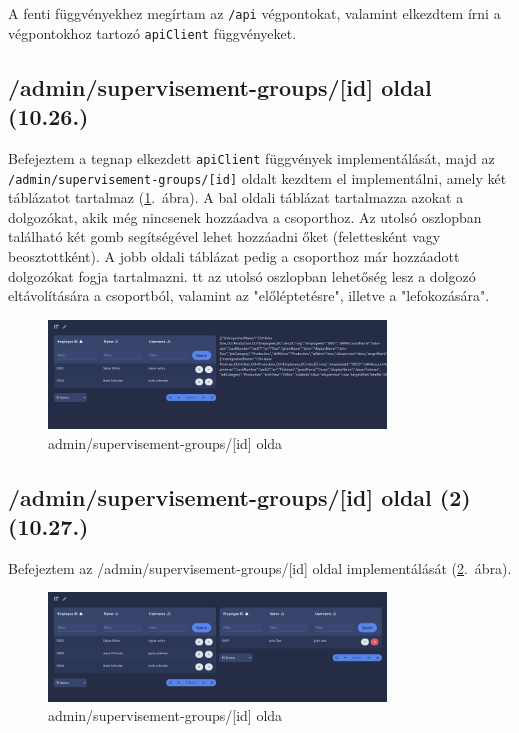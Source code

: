 \documentclass[a4paper]{article}
\newcommand{\inltxt}[1]{\texttt{#1}}
\begin{document}
A fenti függvényekhez megírtam az \inltxt{/api} végpontokat, valamint elkezdtem írni a végpontokhoz
tartozó \inltxt{apiClient} függvényeket.


\subsection{/admin/supervisement-groups/[id] oldal (10.26.)}

Befejeztem a tegnap elkezdett \inltxt{apiClient} függvények implementálását, majd az
\inltxt{/admin/supervisement-groups/[id]} oldalt kezdtem el implementálni, amely két táblázatot
tartalmaz (\ref{fig:sup_edit}.~ábra). A bal oldali táblázat tartalmazza azokat a dolgozókat, akik még nincsenek hozzáadva a csoporthoz. Az
utolsó oszlopban található két gomb segítségével lehet hozzáadni őket (felettesként vagy
beosztottként). A jobb oldali táblázat pedig a csoporthoz már hozzáadott dolgozókat fogja tartalmazni.
tt az utolsó oszlopban lehetőség lesz a dolgozó eltávolítására a csoportból, valamint az
"előléptetésre", illetve a "lefokozására".


\begin{figure}[ht]
  \centering
  \includegraphics[width = 0.8\textwidth]{images/sup_edit.png}
  \caption{admin/supervisement-groups/[id] olda}
  \label{fig:sup_edit}
\end{figure}

\subsection{/admin/supervisement-groups/[id] oldal (2) (10.27.)}

Befejeztem az /admin/supervisement-groups/[id] oldal implementálását (\ref{fig:sup_edit_final}.~ábra).

\begin{figure}[ht]
  \centering
  \includegraphics[width = 0.8\textwidth]{images/sup_edit_final.png}
  \caption{admin/supervisement-groups/[id] olda}
  \label{fig:sup_edit_final}
\end{figure}
\end{document}
